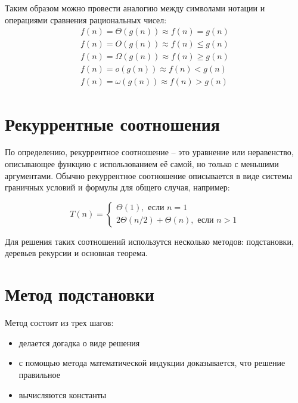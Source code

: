 \documentclass[a4paper,11pt]{article}
\begin{document}
Таким образом можно провести аналогию между символами нотации и операциями
сравнения рациональных чисел:
\begin{align*}
  f(n) = \Theta(g(n)) \approx f(n) = g(n) \\
  f(n) = O(g(n)) \approx f(n) \leqslant  g(n) \\
  f(n) = \Omega(g(n)) \approx f(n) \geqslant g(n) \\
  f(n) = o(g(n)) \approx f(n) < g(n) \\
  f(n) = \omega(g(n)) \approx f(n) > g(n)
\end{align*}

\section{Рекуррентные соотношения}

По определению, рекуррентное соотношение -- это уравнение или неравенство,
описывающее функцию с использованием её самой, но только с меньшими аргументами.
Обычно рекуррентное соотношение описывается в виде системы граничных условий
и формулы для общего случая, например:

\begin{equation*}
  T(n) = \begin{cases}
    \Theta(1), \text{ если } n = 1 \\
    2\Theta(n/2) + \Theta(n), \text{ если } n > 1
    \end{cases}
\end{equation*}

Для решения таких соотношений использутся несколько методов: подстановки,
деревьев рекурсии и основная теорема.

\section{Метод подстановки}

Метод состоит из трех шагов:
\begin{itemize}
\item делается догадка о виде решения
\item с помощью метода математической индукции доказывается, что решение правильное
\item вычисляются константы 
\end{itemize}
\end{document}
